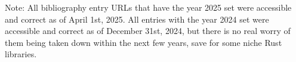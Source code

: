 \renewcommand*\chapterpagestyle{scrheadings}
\printbibliography[heading=bibintoc]

Note: All bibliography entry URLs that have the year 2025 set were accessible and correct as of April 1st, 2025.
All entries with the year 2024 set were accessible and correct as of December 31st, 2024,
but there is no real worry of them being taken down within the next few years, save for some niche Rust libraries.